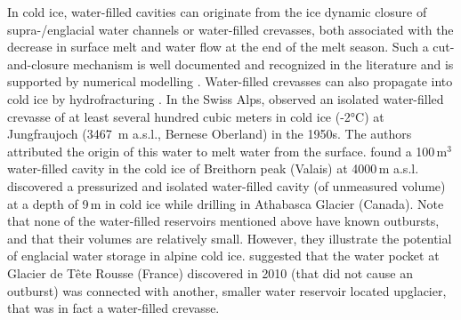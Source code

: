 In cold ice, water-filled cavities can originate from the ice dynamic closure of supra-/englacial water channels or water-filled crevasses, both associated with the decrease in surface melt and water flow at the end of the melt season. Such a cut-and-closure mechanism is well documented and recognized in the literature \citep[e.g.][]{Gulley&al2009,Irvine&al2011} and is supported by numerical modelling \citep{Jarosch&Gudmundsson2012}. Water-filled crevasses can also propagate into cold ice by hydrofracturing \citep[e.g.][]{Benn&al2009,Scambos&al2009}. In the Swiss Alps, \cite{Haefeli&Brentani1955} observed an isolated water-filled crevasse of at least several hundred cubic meters in cold ice (-2°C) at Jungfraujoch (3467 \,m a.s.l., Bernese Oberland) in the 1950s. The authors attributed the origin of this water to melt water from the surface. \cite{Fisher1963} found a 100\,m$^3$ water-filled cavity in the cold ice of Breithorn peak (Valais) at 4000\,m a.s.l. \cite{Paterson&Savage1970} discovered a pressurized and isolated water-filled cavity (of unmeasured volume) at a depth of 9\,m in cold ice while drilling in Athabasca Glacier (Canada). Note that none of the water-filled reservoirs mentioned above have known outbursts, and that their volumes are relatively small. However, they illustrate the potential of englacial water storage in alpine cold ice. \cite{Vincent&al2015} suggested that the water pocket at Glacier de Tête Rousse (France) discovered in 2010 (that did not cause an outburst) was connected with another, smaller water reservoir located upglacier, that was in fact a water-filled crevasse. 
